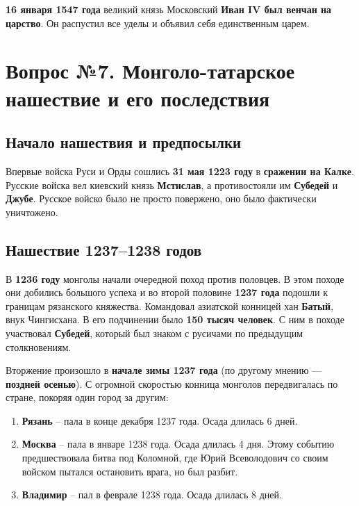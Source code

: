 \documentclass{article}
\begin{document}
\textbf{16 января 1547 года} великий князь Московский \textbf{Иван IV был венчан на царство}. Он распустил все уделы и объявил себя единственным царем.

\pagebreak
\section{Вопрос №7. Монголо-татарское нашествие и его последствия}

\subsection{Начало нашествия и предпосылки}

Впервые войска Руси и Орды сошлись \textbf{31 мая 1223 году} в \textbf{сражении на Калке}. Русские войска вел киевский князь \textbf{Мстислав}, а противостояли им \textbf{Субедей} и \textbf{Джубе}. Русское войско было не просто повержено, оно было фактически уничтожено.

\subsection{Нашествие 1237–1238 годов}

В \textbf{1236 году} монголы начали очередной поход против половцев. В этом походе они добились большого успеха и во второй половине \textbf{1237 года} подошли к границам рязанского княжества.  Командовал азиатской конницей хан \textbf{Батый}, внук Чингисхана. В его подчинении было \textbf{150 тысяч человек}. С ним в походе участвовал \textbf{Субедей}, который был знаком с русичами по предыдущим столкновениям.

\hfill

Вторжение произошло в \textbf{начале зимы 1237 года} (по другому мнению — \textbf{поздней осенью}). С огромной скоростью конница монголов передвигалась по стране, покоряя один город за другим:

\begin{enumerate}
    \item \textbf{Рязань} – пала в конце декабря 1237 года. Осада длилась 6 дней.
    \item \textbf{Москва} – пала в январе 1238 года. Осада длилась 4 дня. Этому событию предшествовала битва под Коломной, где Юрий Всеволодович со своим войском пытался остановить врага, но был разбит.
    \item \textbf{Владимир} – пал в феврале 1238 года. Осада длилась 8 дней. 
\end{enumerate}
\end{document}
